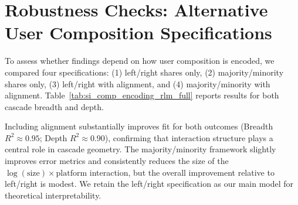 \documentclass[letterpaper]{article} %
\begin{document}
\section{Robustness Checks: Alternative User Composition Specifications}
\label{app:robustcheck}
To assess whether findings depend on how user composition is encoded, we compared four specifications: (1) left/right shares only, (2) majority/minority shares only, (3) left/right with alignment, and (4) majority/minority with alignment. Table~\ref{tab:si_comp_encoding_rlm_full} reports results for both cascade breadth and depth.

Including alignment substantially improves fit for both outcomes (Breadth $R^2 \approx 0.95$; Depth $R^2 \approx 0.90$), confirming that interaction structure plays a central role in cascade geometry. The majority/minority framework slightly improves error metrics and consistently reduces the size of the $\log(\text{size}) \times \text{platform}$ interaction, but the overall improvement relative to left/right is modest. We retain the left/right specification as our main model for theoretical interpretability.
\end{document}
